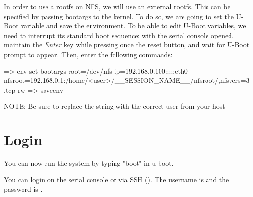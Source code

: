 In order to use a rootfs on NFS, we will use an external rootfs. This can be
specified by passing bootargs to the kernel. To do so, we are going to set the
 U-Boot variable and save the environment. To be able to edit
U-Boot variables, we need to interrupt its standard boot sequence: with the
serial console opened, maintain the {\em Enter} key while pressing once the reset button,
and wait for U-Boot prompt to appear. Then, enter the following commands:

\begin{bashinput}
=> env set bootargs root=/dev/nfs ip=192.168.0.100:::::eth0
  nfsroot=192.168.0.1:/home/<user>/__SESSION_NAME__/nfsroot/,nfsvers=3,tcp rw
=> saveenv
\end{bashinput}

NOTE: Be sure to replace the  string with the correct user
from your host

\section{Login}

You can now run the system by typing "boot" in u-boot.

You can login on the serial console or via SSH (). The username is  and the password
is .
